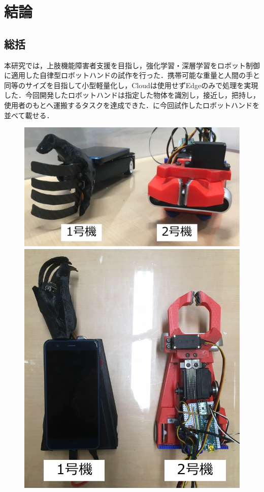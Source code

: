 \chapter{結論}
\newpage

\section{総括}
本研究では，上肢機能障害者支援を目指し，強化学習・深層学習をロボット制御に適用した自律型ロボットハンドの試作を行った．携帯可能な重量と人間の手と同等のサイズを目指して小型軽量化し，Cloudは使用せずEdgeのみで処理を実現した．今回開発したロボットハンドは指定した物体を識別し，接近し，把持し，使用者のもとへ運搬するタスクを達成できた．に今回試作したロボットハンドを並べて載せる．
\begin{figure}[H]
    \centering
    \begin{minipage}{0.6\hsize}
        \centering
        \includegraphics[width=\linewidth]{figure/chapter5/ロボットハンドまとめ前}
    \end{minipage}
    \begin{minipage}{0.3\hsize}
        \centering
        \includegraphics[width=\linewidth]{figure/chapter5/ロボットハンドまとめ上}

\end{minipage}
\end{figure}
